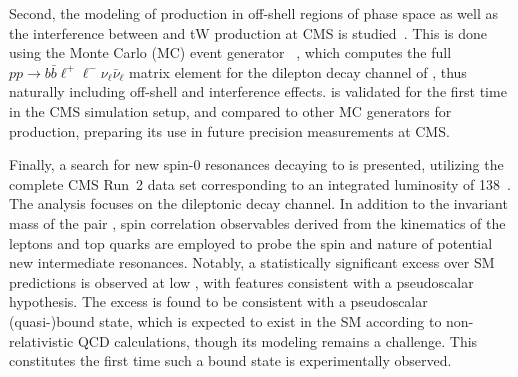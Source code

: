 
Second, the modeling of \ttbar production in off-shell regions of phase space as well as the interference between \ttbar and tW production at CMS is studied~\cite{CMS:NOTE-2023-015}. This is done using the Monte Carlo (MC) event generator \bbfourl~\cite{Jezo:2016ujg}, which computes the full $p p \rightarrow b \bar{b} \ell^+ \ell^- \nu_{\ell} \bar{\nu}_{\ell}$ matrix element for the dilepton decay channel of \ttbar, thus naturally including off-shell and interference effects. \bbfourl is validated for the first time in the CMS simulation setup, and compared to other MC generators for \ttbar production, preparing its use in future precision measurements at CMS.


Finally, a search for new spin-0 resonances decaying to \ttbar is presented, utilizing the complete CMS Run~2 data set corresponding to an integrated luminosity of \SI{138}{\fbinv}~\cite{CMS:TOP-24-007,CMS:HIG-22-013}. The analysis focuses on the dileptonic decay channel. In addition to the invariant mass of the \ttbar pair \mtt, spin correlation observables derived from the kinematics of the leptons and top quarks are employed to probe the spin and \CP nature of potential new intermediate resonances. Notably, a statistically significant excess over SM predictions is observed at low \mtt, with features consistent with a pseudoscalar hypothesis.
The excess is found to be consistent with a pseudoscalar \ttbar (quasi-)bound state, which is expected to exist in the SM according to non-relativistic QCD calculations, though its modeling remains a challenge. This constitutes the first time such a \ttbar bound state is experimentally observed.


